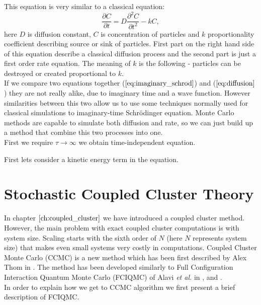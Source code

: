 \documentclass[twoside,english]{uiofysmaster}
\theoremstyle{definition}
\begin{document}
This equation is very similar to a classical equation:
\begin{equation}\label{eq:diffusion}
\frac{\partial C }{ \partial t} = D \frac{\partial^2 C }{ \partial t^2} - kC,
\end{equation}
here $D$ is diffusion constant, $C$ is concentration of particles and $k$ proportionality coefficient describing source or sink of particles. First part on the right hand side of this equation describe a classical diffusion process and the second part is just a first order rate equation. The meaning of $k$ is the following - particles can be destroyed or created proportional to $k$.\\
If we compare two equations together ($\ref{eq:imaginary_schrod}$) and ($\ref{eq:diffusion}$) they are not really alike, due to imaginary time and a wave function. However similarities between this two allow us to use some techniques normally used for classical simulations to imaginary-time Schr\"{o}dinger equation. Monte Carlo methods are capable to simulate both diffusion and rate, so we can just build up a method that combine this two processes into one.  \\
First we require $\tau \rightarrow \infty $ we obtain time-independent equation. 


First lets consider a kinetic energy term in the equation. 


\section{Stochastic Coupled Cluster Theory}
In chapter $\ref{ch:coupled_cluster}$ we have introduced a coupled cluster method. However, the main problem with exact coupled cluster computations is with system size. Scaling starts with the sixth order of $N$ (here $N$ represents system size) that makes even small systems very costly in computations. Coupled Cluster Monte Carlo (CCMC) is a new method which has been first described by Alex Thom in \cite{thomStochasticCoupledCluster2010}. The method has been developed similarly to Full Configuration Interaction Quantum Monte Carlo (FCIQMC) of Alavi \textit{et al.} in \cite{boothFermionMonteCarlo2009}, \cite{clelandCommunicationsSurvivalFittest2010} and \cite{boothApproachingChemicalAccuracy2010}.\\
In order to explain how we get to CCMC algorithm we first present a brief description of FCIQMC. \\
\end{document}
